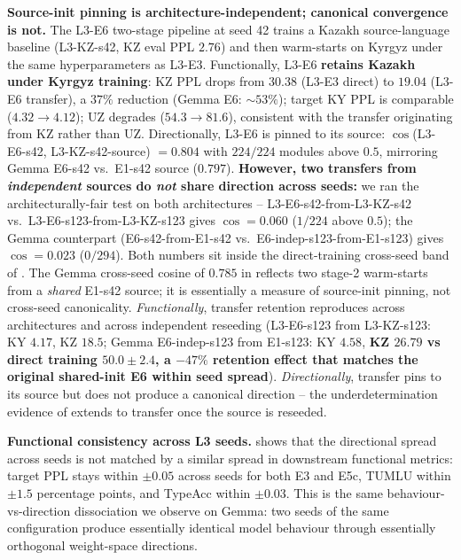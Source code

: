 \documentclass[11pt]{article}
\begin{document}
\textbf{Source-init pinning is architecture-independent; canonical convergence is not.} The L3-E6 two-stage pipeline at seed 42 trains a Kazakh source-language baseline (L3-KZ-s42, KZ eval PPL $2.76$) and then warm-starts on Kyrgyz under the same hyperparameters as L3-E3. Functionally, L3-E6 \textbf{retains Kazakh under Kyrgyz training}: KZ PPL drops from $30.38$ (L3-E3 direct) to $19.04$ (L3-E6 transfer), a $37\%$ reduction (Gemma E6: $\sim 53\%$); target KY PPL is comparable ($4.32 \to 4.12$); UZ degrades ($54.3 \to 81.6$), consistent with the transfer originating from KZ rather than UZ. Directionally, L3-E6 is pinned to its source: $\cos$(L3-E6-s42, L3-KZ-s42-source) $= 0.804$ with $224/224$ modules above $0.5$, mirroring Gemma E6-s42 vs.\ E1-s42 source ($0.797$). \textbf{However, two transfers from \emph{independent} sources do \emph{not} share direction across seeds:} we ran the architecturally-fair test on both architectures -- L3-E6-s42-from-L3-KZ-s42 vs.\ L3-E6-s123-from-L3-KZ-s123 gives $\cos = 0.060$ ($1/224$ above $0.5$); the Gemma counterpart (E6-s42-from-E1-s42 vs.\ E6-indep-s123-from-E1-s123) gives $\cos = 0.023$ ($0/294$). Both numbers sit inside the direct-training cross-seed band of . The Gemma cross-seed cosine of $0.785$ in  reflects two stage-2 warm-starts from a \emph{shared} E1-s42 source; it is essentially a measure of source-init pinning, not cross-seed canonicality. \emph{Functionally}, transfer retention reproduces across architectures and across independent reseeding (L3-E6-s123 from L3-KZ-s123: KY $4.17$, KZ $18.5$; Gemma E6-indep-s123 from E1-s123: KY $4.58$, \textbf{KZ $26.79$ vs direct training $50.0\pm 2.4$, a $-47\%$ retention effect that matches the original shared-init E6 within seed spread}). \emph{Directionally}, transfer pins to its source but does not produce a canonical direction -- the underdetermination evidence of  extends to transfer once the source is reseeded.

\textbf{Functional consistency across L3 seeds.}  shows that the directional spread across seeds is not matched by a similar spread in downstream functional metrics: target PPL stays within $\pm 0.05$ across seeds for both E3 and E5c, TUMLU within $\pm 1.5$ percentage points, and TypeAcc within $\pm 0.03$. This is the same behaviour-vs-direction dissociation we observe on Gemma: two seeds of the same configuration produce essentially identical model behaviour through essentially orthogonal weight-space directions.
\end{document}
